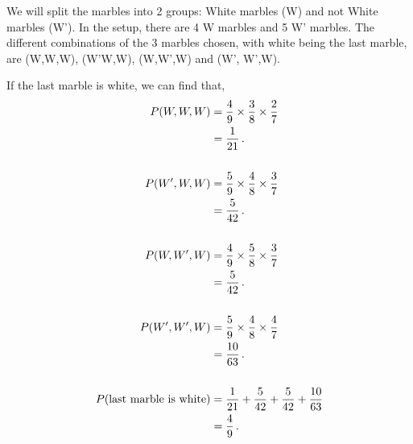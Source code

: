 \begin{subquestions}
\begin{subsubquestions}
We will split the marbles into 2 groups: White marbles (W) and not White marbles (W'). In the setup, there are 4 W marbles and 5 W' marbles. The different combinations of the 3 marbles chosen, with white being the last marble, are (W,W,W), (W'W,W), (W,W',W) and (W', W',W). 

If the last marble is white, we can find that,
\begin{align}
	P(W,W,W) & = \frac{4}{9} \times \frac{3}{8} \times \frac{2}{7} \nonumber \\
	         & = \frac{1}{21} \,. \\ \nonumber \\
	P(W',W,W) & = \frac{5}{9} \times \frac{4}{8} \times \frac{3}{7} \nonumber \\
              & = \frac{5}{42} \,. \\ \nonumber \\
	P(W,W',W) & = \frac{4}{9} \times \frac{5}{8} \times \frac{3}{7} \nonumber \\
			  & = \frac{5}{42} \,. \\ \nonumber \\
	P(W',W',W)& = \frac{5}{9} \times \frac{4}{8} \times \frac{4}{7} \nonumber \\
			  & = \frac{10}{63} \,. \\ \nonumber \\
	P(\text{last marble is white}) & = \frac{1}{21} + \frac{5}{42} + \frac{5}{42} + \frac{10}{63} \nonumber \\
	                               & = \frac{4}{9} \,.
\end{align}

\end{subsubquestions}





\end{subquestions}
